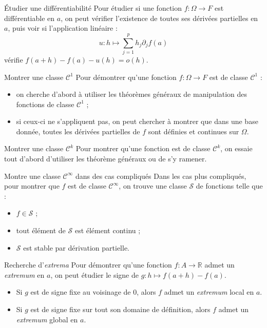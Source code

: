 \documentclass[french]{book}
\newcommand{\R}{\mathbb{R}}
\theoremstyle{plain}
\theoremstyle{definition}
\theoremstyle{remark}
\begin{document}
\begin{PM}{Étudier une différentiabilité}
	Pour étudier si une fonction $f:\Omega\to F$ est différentiable en $a$, on peut vérifier l'existence de toutes ses dérivées partielles en $a$, puis voir si l'application linéaire : $$u:h\mapsto\sum_{j=1}^{p}h_j\partial_jf(a)$$ vérifie $f(a+h)-f(a)-u(h)=o(h)$.
\end{PM}

\begin{PM}{Montrer une classe $\mathcal{C}^1$}
	Pour démontrer qu'une fonction $f:\Omega\to F$ est de classe $\mathcal{C}^1$ :
	\begin{itemize}
		\item on cherche d'abord à utiliser les théorèmes généraux de manipulation des fonctions de classe $\mathcal{C}^1$ ;
		\item si ceux-ci ne s'appliquent pas, on peut chercher à montrer que dans une base donnée, toutes les dérivées partielles de $f$ sont définies et continues sur $\Omega$.
	\end{itemize}
\end{PM}

\begin{PM}{Montrer une classe $\mathcal{C}^k$}
	Pour montrer qu'une fonction est de classe $\mathcal{C}^k$, on essaie tout d'abord d'utiliser les théorème généraux ou de s'y ramener.
\end{PM}
\begin{PM}{Montre une classe $\mathcal{C}^\infty$ dans des cas compliqués}
	Dans les cas plus compliqués, pour montrer que $f$ est de classe $\mathcal{C}^\infty$, on trouve une classe $\mathcal{S}$ de fonctions telle que :
	\begin{itemize}
		\item $f\in \mathcal{S}$ ;
		\item tout élément de $\mathcal{S}$ est élément continu ;
		\item $\mathcal{S}$ est stable par dérivation partielle.
	\end{itemize}
\end{PM}

\begin{PM}{Recherche d'\textit{extrema}}
	Pour démontrer qu'une fonction $f:A\to\R$ admet un \textit{extremum} en $a$, on peut étudier le signe de $g:h\mapsto f(a+h)-f(a)$.
	\begin{itemize}
		\item Si $g$ est de signe fixe au voisinage de $0$, alors $f$ admet un \textit{extremum} local en $a$.
		\item Si $g$ est de signe fixe sur tout son domaine de définition, alors $f$ admet un \textit{extremum} global en $a$.
	\end{itemize}
\end{PM}
\end{document}
